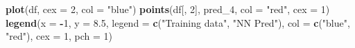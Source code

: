 \documentclass[
]{article}
\newenvironment{Shaded}{\begin{snugshade}}{\end{snugshade}}
\newcommand{\AttributeTok}[1]{\textcolor[rgb]{0.13,0.29,0.53}{#1}}
\newcommand{\DecValTok}[1]{\textcolor[rgb]{0.00,0.00,0.81}{#1}}
\newcommand{\FloatTok}[1]{\textcolor[rgb]{0.00,0.00,0.81}{#1}}
\newcommand{\FunctionTok}[1]{\textcolor[rgb]{0.13,0.29,0.53}{\textbf{#1}}}
\newcommand{\NormalTok}[1]{#1}
\newcommand{\SpecialCharTok}[1]{\textcolor[rgb]{0.81,0.36,0.00}{\textbf{#1}}}
\newcommand{\StringTok}[1]{\textcolor[rgb]{0.31,0.60,0.02}{#1}}
\begin{document}
\begin{Shaded}
\begin{Highlighting}[]
\FunctionTok{plot}\NormalTok{(df, }\AttributeTok{cex =} \DecValTok{2}\NormalTok{, }\AttributeTok{col =} \StringTok{"blue"}\NormalTok{)}
\FunctionTok{points}\NormalTok{(df[, }\DecValTok{2}\NormalTok{], pred\_4, }\AttributeTok{col =} \StringTok{"red"}\NormalTok{, }\AttributeTok{cex =} \DecValTok{1}\NormalTok{)}
\FunctionTok{legend}\NormalTok{(}\AttributeTok{x =} \SpecialCharTok{{-}}\DecValTok{1}\NormalTok{, }\AttributeTok{y =} \FloatTok{8.5}\NormalTok{, }\AttributeTok{legend =} \FunctionTok{c}\NormalTok{(}\StringTok{"Training data"}\NormalTok{, }\StringTok{"NN Pred"}\NormalTok{),}
\AttributeTok{col =} \FunctionTok{c}\NormalTok{(}\StringTok{"blue"}\NormalTok{, }\StringTok{"red"}\NormalTok{), }\AttributeTok{cex =} \DecValTok{1}\NormalTok{, }\AttributeTok{pch =} \DecValTok{1}\NormalTok{)}
\end{Highlighting}
\end{Shaded}
\end{document}
